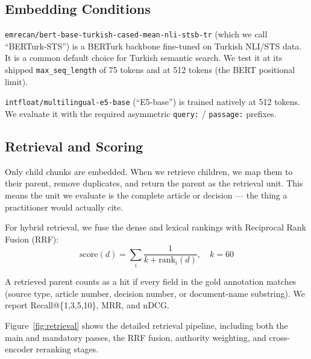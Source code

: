 \documentclass[11pt,a4paper,twocolumn]{article}
\begin{document}
\subsection{Embedding Conditions}

\texttt{emrecan/bert-base-turkish-cased-mean-nli-stsb-tr} (which we call ``BERTurk-STS'') is a BERTurk backbone fine-tuned on Turkish NLI/STS data. It is a common default choice for Turkish semantic search. We test it at its shipped \texttt{max\_seq\_length} of 75 tokens and at 512 tokens (the BERT positional limit).

\texttt{intfloat/multilingual-e5-base} (``E5-base'') is trained natively at 512 tokens. We evaluate it with the required asymmetric \texttt{query:} / \texttt{passage:} prefixes.

\subsection{Retrieval and Scoring}
\label{subsec:retrieval}

Only child chunks are embedded. When we retrieve children, we map them to their parent, remove duplicates, and return the parent as the retrieval unit. This means the unit we evaluate is the complete article or decision --- the thing a practitioner would actually cite.

For hybrid retrieval, we fuse the dense and lexical rankings with Reciprocal Rank Fusion (RRF):
\begin{equation}
  \text{score}(d) = \sum_i \frac{1}{k + \text{rank}_i(d)}, \quad k = 60
  \label{eq:rrf}
\end{equation}

A retrieved parent counts as a hit if every field in the gold annotation matches (source type, article number, decision number, or document-name substring). We report Recall@\{1,3,5,10\}, MRR, and nDCG.

Figure~\ref{fig:retrieval} shows the detailed retrieval pipeline, including both the main and mandatory passes, the RRF fusion, authority weighting, and cross-encoder reranking stages.
\end{document}
